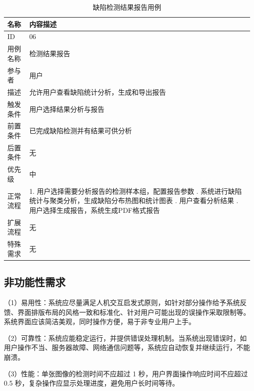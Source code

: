 \documentclass[
  ]{njuthesis}
\begin{document}
\begin{table}[H]
    \centering
    \caption{缺陷检测结果报告用例}
    \label{usecase_detection_report}
    \renewcommand\arraystretch{0.5}
    \begin{tabular}{p{2.5cm}p{11cm}}
    \toprule[1.5pt]
    名称 & 内容描述 \\
    \midrule[1pt]
    ID & 06 \\
    \midrule[0.5pt]
    用例名称 & 检测结果报告 \\
    \midrule[0.5pt]
    参与者 & 用户 \\
    \midrule[0.5pt]
    描述 & 允许用户查看缺陷统计分析，生成和导出报告 \\
    \midrule[0.5pt]
    触发条件 & 用户选择结果分析与报告 \\
    \midrule[0.5pt]
    前置条件 & 已完成缺陷检测并有结果可供分析 \\
    \midrule[0.5pt]
    后置条件 & 无 \\
    \midrule[0.5pt]
    优先级 & 中 \\
    \midrule[0.5pt]
    正常流程 & 1. 用户选择需要分析报告的检测样本组，配置报告参数 \newline
    2. 系统进行缺陷统计与聚类分析，生成缺陷分布热图和统计图表 \newline
    3. 用户查看分析结果 \newline
    4. 用户选择生成报告，系统生成PDF格式报告 \\
    \midrule[0.5pt]
    扩展流程 & 无 \\
    \midrule[0.5pt]
    特殊需求 & 无 \\
    \bottomrule[1.5pt]
    \end{tabular}
\end{table}

\subsection{非功能性需求}

（1）易用性：系统应尽量满足人机交互启发式原则，如针对部分操作给予系统反馈、界面排版布局的风格一致和标准化、针对用户可能出现的误操作采取限制等。系统界面应该简洁美观，同时操作方便，易于非专业用户上手。

（2）可靠性：系统应能稳定运行，并提供错误处理机制。当系统出现错误时，如用户操作不当、服务器故障、网络通信问题等，系统应自动恢复并继续运行，不能崩溃。

（3）性能：单张图像的检测时间不应超过 1 秒，用户界面操作响应时间不应超过 0.5 秒，复杂操作应显示处理进度，避免用户长时间等待。
\end{document}
